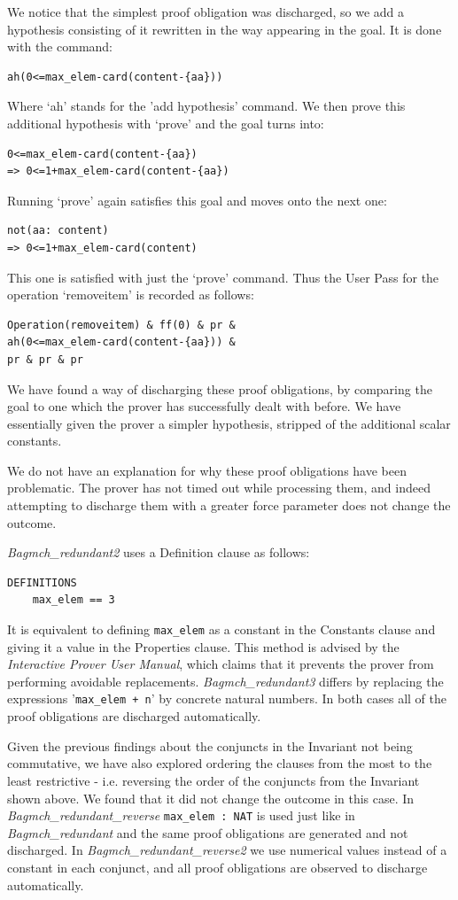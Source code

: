 \documentclass[12pt,journal,duplex]{IEEEtran}
\begin{document}
	We notice that the simplest proof obligation was discharged, so we add a hypothesis consisting of it rewritten in the way appearing in the goal. It is done with the command:
	\begin{lstlisting}
ah(0<=max_elem-card(content-{aa}))
	\end{lstlisting}
	Where `ah' stands for the 'add hypothesis' command. We then prove this additional hypothesis with `prove' and the goal turns into:
	\begin{lstlisting}
0<=max_elem-card(content-{aa})
=> 0<=1+max_elem-card(content-{aa})
	\end{lstlisting}
	Running `prove' again satisfies this goal and moves onto the next one:
	\begin{lstlisting}
not(aa: content)
=> 0<=1+max_elem-card(content)
	\end{lstlisting}
	This one is satisfied with just the `prove' command. Thus the User Pass for the operation `removeitem' is recorded as follows:
	\begin{lstlisting}
Operation(removeitem) & ff(0) & pr &
ah(0<=max_elem-card(content-{aa})) &
pr & pr & pr
	\end{lstlisting}
	We have found a way of discharging these proof obligations, by comparing the goal to one which the prover has successfully dealt with before. We have essentially given the prover a simpler hypothesis, stripped of the additional scalar constants.

	We do not have an explanation for why these proof obligations have been problematic. The prover has not timed out while processing them, and indeed attempting to discharge them with a greater force parameter does not change the outcome.

	\emph{Bagmch\_redundant2} uses a Definition clause as follows:
	\begin{lstlisting}
DEFINITIONS
	max_elem == 3
	\end{lstlisting}
	It is equivalent to defining \texttt{max\_elem} as a constant in the Constants clause and giving it a value in the Properties clause. This method is advised by the \emph{Interactive Prover User Manual}\cite{Prover guide}, which claims that it prevents the prover from performing avoidable replacements. \emph{Bagmch\_redundant3} differs by replacing the expressions '\texttt{max\_elem + n}' by concrete natural numbers. In both cases all of the proof obligations are discharged automatically.

	Given the previous findings about the conjuncts in the Invariant not being commutative, we have also explored ordering the clauses from the most to the least restrictive - i.e. reversing the order of the conjuncts from the Invariant shown above. We found that it did not change the outcome in this case. In \emph{Bagmch\_redundant\_reverse} \texttt{max\_elem : NAT} is used just like in \emph{Bagmch\_redundant} and the same proof obligations are generated and not discharged. In \emph{Bagmch\_redundant\_reverse2} we use numerical values instead of a constant in each conjunct, and all proof obligations are observed to discharge automatically.
\end{document}
